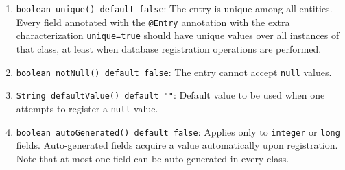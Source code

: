 \documentclass[a4paper,10pt]{article}
\begin{document}
\begin{enumerate}\label{unique}
	\item \texttt{boolean unique() default false}: 
	The entry is unique among all entities. Every field annotated with the \texttt{@Entry}
        annotation with the extra characterization \texttt{unique=true} should have
        unique values over all instances of that class, at least when database registration
        operations are performed.
	\item \texttt{boolean notNull() default false}: The entry cannot accept \texttt{null} values.
	\item \texttt{String defaultValue() default ""}: Default value to be used when one attempts
	to register a \texttt{null} value.
	\item \texttt{boolean autoGenerated() default false}: Applies only to \texttt{integer} or \texttt{long} fields. 
	Auto-generated fields acquire a value automatically upon registration. Note that at most
	one field can be auto-generated in every class.
\end{enumerate}
\end{document}
